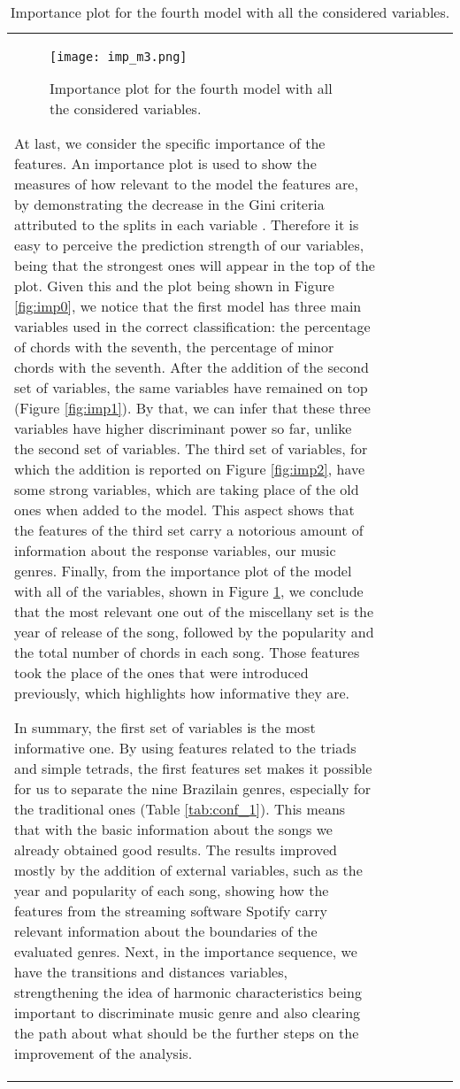 \documentclass[twocolumn]{article}
\begin{document}
\begin{table}[ht]
\begin{tabular}{llllll}
\begin{figure}[h]
\centering
\texttt{[image: imp\_m3.png]}
\caption{Importance plot for the fourth model with all the considered variables.}
\label{fig:imp3}
\end{figure}

At last, we consider the specific importance of the 
features. An importance plot is used to show the measures
of how relevant to the model the features are,
by demonstrating the decrease in the Gini criteria
attributed to the splits in each variable \cite{Hastie}.
Therefore it is easy to perceive the prediction
strength of our variables, being that the strongest
ones will appear in the top of the plot. 
Given this and the plot being shown in 
Figure \ref{fig:imp0}, we notice that 
the first model has three main variables used in the correct
classification: the percentage of chords with the
seventh, the percentage of minor chords with the seventh. 
After the addition of the second set of variables, 
the same variables have remained on top (Figure \ref{fig:imp1}).
By that, we can infer that these three variables have higher discriminant power so far, unlike the second set of variables. 
The third set of variables, for which the addition
is reported on Figure \ref{fig:imp2},
have some strong variables, which are taking 
place of the old ones when added to the model.
This aspect shows that the features of the third
set carry a notorious amount of information about the 
response variables, our music genres. 
Finally, from the importance plot of the model 
with all of the variables, shown in Figure \ref{fig:imp3}, 
we conclude that the most relevant one out of the miscellany
set is the year of release of the song, followed by 
the popularity and the total number of chords in each song.
Those features took the place of the ones that were introduced
previously, which highlights how informative they are. 

In summary, the first set of variables is 
the most informative one. By using features
related to the triads and simple tetrads, the 
first features set makes it possible for us to separate 
the nine Brazilain genres, especially for the
traditional ones (Table \ref{tab:conf_1}). This means
that with the basic information about the songs we 
already obtained good results. The 
results improved mostly by the addition
of external variables, such as the year 
and popularity of each song, showing how 
the features from the streaming software 
Spotify carry relevant information
about the boundaries of the evaluated genres. 
Next, in the importance sequence, we have the transitions 
and distances variables, strengthening the idea of 
harmonic characteristics being important
to discriminate music genre and also clearing the 
path about what should be the further steps on the 
improvement of the analysis. 




\end{tabular}
\end{table}
\end{document}
